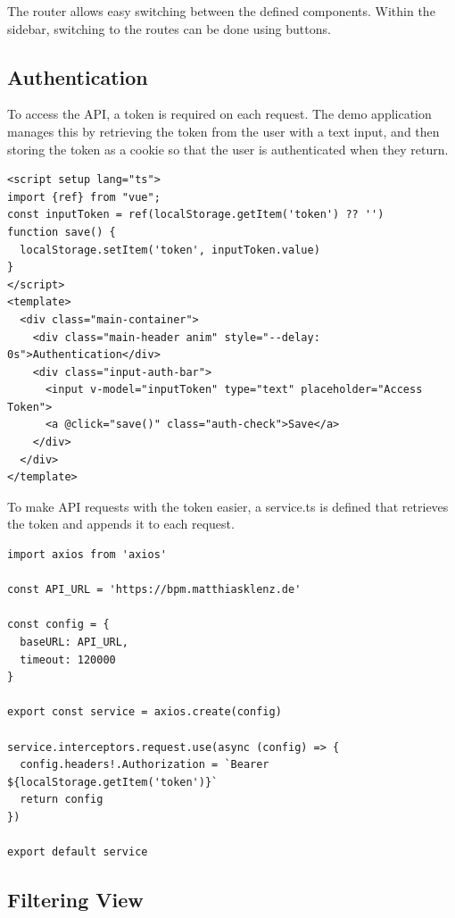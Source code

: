 The router allows easy switching between the defined components. Within the sidebar, switching to the routes can be done using buttons.

\subsection{Authentication}

To access the API, a token is required on each request. The demo application manages this by retrieving the token from the user with a text input, and then storing the token as a cookie so that the user is authenticated when they return. 

\begin{verbatim}
<script setup lang="ts">
import {ref} from "vue";
const inputToken = ref(localStorage.getItem('token') ?? '')
function save() {
  localStorage.setItem('token', inputToken.value)
}
</script>
<template>
  <div class="main-container">
    <div class="main-header anim" style="--delay: 0s">Authentication</div>
    <div class="input-auth-bar">
      <input v-model="inputToken" type="text" placeholder="Access Token">
      <a @click="save()" class="auth-check">Save</a>
    </div>
  </div>
</template>
\end{verbatim}

To make API requests with the token easier, a service.ts is defined that retrieves the token and appends it to each request.

\begin{verbatim}
import axios from 'axios'

const API_URL = 'https://bpm.matthiasklenz.de'

const config = {
  baseURL: API_URL,
  timeout: 120000
}

export const service = axios.create(config)

service.interceptors.request.use(async (config) => {
  config.headers!.Authorization = `Bearer ${localStorage.getItem('token')}`
  return config
})

export default service
\end{verbatim}

\subsection{Filtering View}

